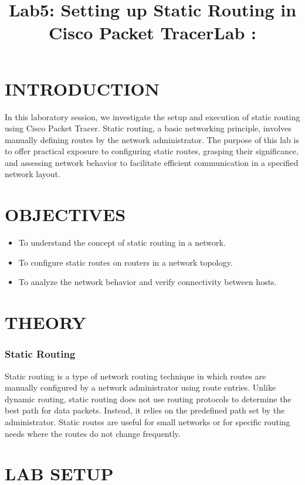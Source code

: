 \documentclass[a4paper,12pt]{article}
\title{Lab5: Setting up Static Routing in Cisco Packet Tracer}
\author{\cName}
\title{Lab \cLabNumber: \cTitle}
\date{}
\author{}
\begin{document}
\maketitle
\vspace{-2cm}
\section*{INTRODUCTION}
In this laboratory session, we investigate the setup and execution of static routing using Cisco Packet Tracer. Static routing, a basic networking principle, involves manually defining routes by the network administrator. The purpose of this lab is to offer practical exposure to configuring static routes, grasping their significance, and assessing network behavior to facilitate efficient communication in a specified network layout.

\section*{OBJECTIVES}
\begin{itemize}
    \item To understand the concept of static routing in a network.
    \item To configure static routes on routers in a network topology.
    \item To analyze the network behavior and verify connectivity between hosts.
\end{itemize}

\section*{THEORY}

\subsubsection*{Static Routing}
Static routing is a type of network routing technique in which routes are manually configured by a network administrator using route entries. Unlike dynamic routing, static routing does not use routing protocols to determine the best path for data packets. Instead, it relies on the predefined path set by the administrator. Static routes are useful for small networks or for specific routing needs where the routes do not change frequently.

\section*{LAB SETUP}
\end{document}
